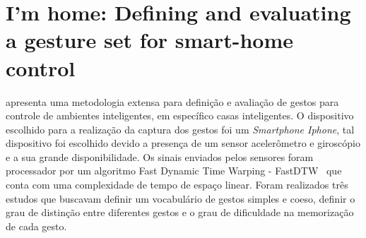 \begin{comment}
\begin{table}[ht]
	\centering
    \caption{Comparação entre Hand.io e SoapBox}
    \label{tab:comp_soapbox}
	\begin{tabular}{|l|c|c|}
    	\hline
		\textbf{Recursos} & \textbf{Hand.io} & \textbf{SoapBox} \\
        \hline
        \hline
        Preso à mão & x &  \\
        \hline
        Utiliza botões &  & x \\
        \hline
        Captura contínua de sinais & x &  \\
        \hline
        \hline
        \textbf{Sensores} & & \\
        \hline
        \hline
        Acelerômetro & x & x \\
        \hline
        Giroscópio & x & \\
        \hline
        \hline
        \textbf{Contexto aplicado} & Residencial & Estúdio de design \\
        \hline
	\end{tabular}

\end{table}
\end{comment}



\section{I'm home: Defining and evaluating a gesture set for smart-home control}

\label{cor:home}

 apresenta uma metodologia extensa para definição e avaliação de gestos para controle de ambientes inteligentes, em específico casas inteligentes. O dispositivo escolhido para a realização da captura dos gestos foi um \textit{Smartphone Iphone}, tal dispositivo foi escolhido devido a presença de um sensor acelerômetro e giroscópio e a sua grande disponibilidade. Os sinais enviados pelos sensores foram processador por um algoritmo Fast Dynamic Time Warping - FastDTW~\cite{Salvador:2007} que conta com uma complexidade de tempo de espaço linear.
% 
Foram realizados três estudos que buscavam definir um vocabulário de gestos simples e coeso, definir o grau de distinção entre diferentes gestos e o grau de dificuldade na memorização de cada gesto. 


